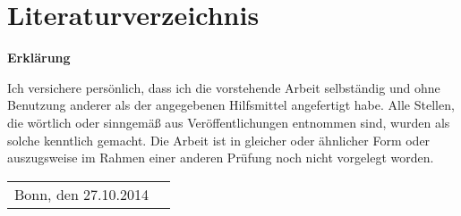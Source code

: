 
\renewcommand\refname{}
\section{Literaturverzeichnis}
%
%
\printbibliography
\pagebreak

\setcounter{page}{1}

\begin{appendix}



\end{appendix}


\newpage
\thispagestyle{empty}
\begin{center}
	\vspace*{5em}
	\huge\textbf{Erklärung}\\
\end{center}
\vspace{2em}
Ich versichere persönlich, dass ich die vorstehende Arbeit selbständig und ohne Benutzung anderer als der angegebenen Hilfsmittel angefertigt habe. Alle Stellen, die wörtlich oder sinngemäß aus Veröffentlichungen entnommen sind, wurden als solche kenntlich gemacht. Die Arbeit ist in gleicher oder ähnlicher Form oder auszugsweise im Rahmen einer anderen Prüfung noch nicht vorgelegt worden.

\vspace{2em}
\begin{minipage}{\linewidth}
	\begin{tabular}{p{15em}p{15em}}
	Bonn, den 27.10.2014
	\end{tabular}
\end{minipage}
